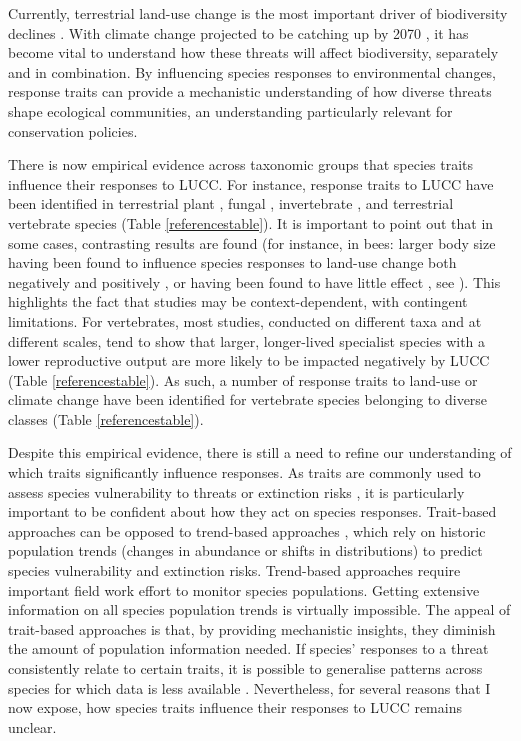 Currently, terrestrial land-use change is the most important driver of biodiversity declines \citep{Newbold2015, Chaudhary2016, Maxwell2016}.  With climate change projected to be catching up by 2070 \citep{Newbold2018}, it has become vital to understand how these threats will affect biodiversity, separately and in combination. By influencing species responses to environmental changes, response traits can provide a mechanistic understanding of how diverse threats shape ecological communities, an understanding particularly relevant for conservation policies. 

There is now empirical evidence across taxonomic groups that species traits influence their responses to LUCC. For instance, response traits to LUCC have been identified in terrestrial plant \citep{Diaz2001}, fungal \citep{Koide2013}, invertebrate \citep{Williams2010, Hall2019}, and terrestrial vertebrate species (Table \ref{referencestable}).
It is important to point out that in some cases, contrasting results are found (for instance, in bees: larger body size having been found to influence species responses to land-use change both negatively \citep{Larsen2005} and positively \citep{Depalma2015}, or having been found to have little effect \citep{Williams2010, Forrest2015}, see \citet{Bartomeus2018}). This highlights the fact that studies may be context-dependent, with contingent limitations. For vertebrates, most studies, conducted on different taxa and at different scales, tend to show that larger, longer-lived specialist species with a lower reproductive output are more likely to be impacted negatively by LUCC (Table \ref{referencestable}). As such, a number of response traits to land-use or climate change have been identified for vertebrate species belonging to diverse classes (Table \ref{referencestable}).

Despite this empirical evidence, there is still a need to refine our understanding of which traits significantly influence responses. As traits are commonly used to assess species vulnerability to threats or extinction risks \citep{Pacifici2015, Willis2015,Bohm2016b}, it is particularly important to be confident about how they act on species responses. Trait-based approaches can be opposed to trend-based approaches \citep{Pacifici2015}, which rely on historic population trends (changes in abundance or shifts in distributions) to predict species vulnerability and extinction risks. Trend-based approaches require important field work effort to monitor species populations. Getting extensive information on all species population trends is virtually impossible. The appeal of trait-based approaches is that, by providing mechanistic insights, they diminish the amount of population information needed. If species’ responses to a threat consistently relate to certain traits, it is possible to generalise patterns across species for which data is less available \citep{Verberk2013}. Nevertheless, for several reasons that I now expose, how species traits influence their responses to LUCC remains unclear.


